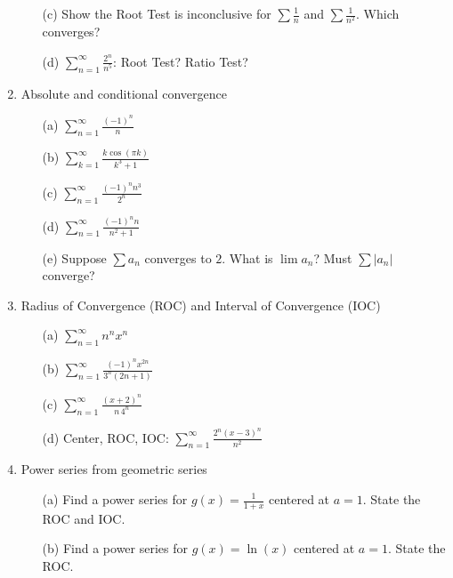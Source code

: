 \documentclass[12pt]{article}
\begin{document}
\begin{enumerate}
\begin{enumerate}
\item[(c)] Show the Root Test is inconclusive for $\sum\frac1n$ and $\sum\frac1{n^2}$. Which converges?

\item[(d)] $\sum_{n=1}^\infty\frac{2^n}{n^5}$: Root Test? Ratio Test?

\end{enumerate}

\setcounter{enumi}{24}
\item Absolute and conditional convergence
\begin{enumerate}
\item[(a)] $\sum_{n=1}^\infty\frac{(-1)^n}{n}$

\item[(b)] $\sum_{k=1}^\infty\frac{k\cos(\pi k)}{k^3+1}$

\item[(c)] $\sum_{n=1}^\infty\frac{(-1)^nn^3}{2^n}$

\item[(d)] $\sum_{n=1}^\infty\frac{(-1)^nn}{n^2+1}$

\item[(e)] Suppose $\sum a_n$ converges to $2$. What is $\lim a_n$? Must $\sum|a_n|$ converge?

\end{enumerate}

\setcounter{enumi}{25}
\item Radius of Convergence (ROC) and Interval of Convergence (IOC)
\begin{enumerate}
\item[(a)] $\sum_{n=1}^\infty n^nx^n$

\item[(b)] $\sum_{n=1}^\infty\frac{(-1)^nx^{2n}}{3^n(2n+1)}$

\item[(c)] $\sum_{n=1}^\infty\frac{(x+2)^n}{n\,4^n}$

\item[(d)] Center, ROC, IOC: $\sum_{n=1}^\infty\frac{2^n(x-3)^n}{n^2}$

\end{enumerate}

\setcounter{enumi}{26}
\item Power series from geometric series
\begin{enumerate}
\item[(a)] Find a power series for $g(x)=\frac{1}{1+x}$ centered at $a=1$. State the ROC and IOC.

\item[(b)] Find a power series for $g(x)=\ln(x)$ centered at $a=1$. State the ROC.


\end{enumerate}
\end{enumerate}
\end{document}
